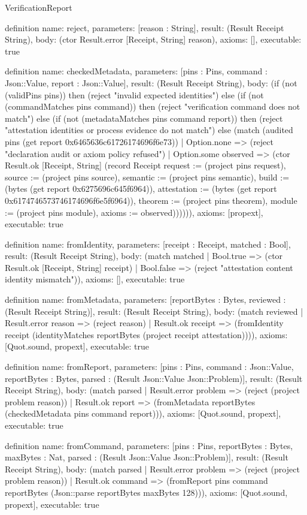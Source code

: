 \begin{lexlean}{VerificationReport}
\begin{semanticmodule}
definition{
  name: reject,
  parameters: [reason : String],
  result: (Result Receipt String),
  body: (ctor Result.error [Receipt, String] reason),
  axioms: [],
  executable: true
}

definition{
  name: checkedMetadata,
  parameters: [pins : Pins, command : Json::Value, report : Json::Value],
  result: (Result Receipt String),
  body: (if (not (validPins pins)) then (reject "invalid expected identities") else (if (not (commandMatches pins command)) then (reject "verification command does not match") else (if (not (metadataMatches pins command report)) then (reject "attestation identities or process evidence do not match") else (match (audited pins (get report 0x6465636c61726174696f6e73)) | Option.none => (reject "declaration audit or axiom policy refused") | Option.some observed => (ctor Result.ok [Receipt, String] (record Receipt {request := (project pins request), source := (project pins source), semantic := (project pins semantic), build := (bytes (get report 0x6275696c645f6964)), attestation := (bytes (get report 0x6174746573746174696f6e5f6964)), theorem := (project pins theorem), module := (project pins module), axioms := observed})))))),
  axioms: [propext],
  executable: true
}

definition{
  name: fromIdentity,
  parameters: [receipt : Receipt, matched : Bool],
  result: (Result Receipt String),
  body: (match matched | Bool.true => (ctor Result.ok [Receipt, String] receipt) | Bool.false => (reject "attestation content identity mismatch")),
  axioms: [],
  executable: true
}

definition{
  name: fromMetadata,
  parameters: [reportBytes : Bytes, reviewed : (Result Receipt String)],
  result: (Result Receipt String),
  body: (match reviewed | Result.error reason => (reject reason) | Result.ok receipt => (fromIdentity receipt (identityMatches reportBytes (project receipt attestation)))),
  axioms: [Quot.sound, propext],
  executable: true
}

definition{
  name: fromReport,
  parameters: [pins : Pins, command : Json::Value, reportBytes : Bytes, parsed : (Result Json::Value Json::Problem)],
  result: (Result Receipt String),
  body: (match parsed | Result.error problem => (reject (project problem reason)) | Result.ok report => (fromMetadata reportBytes (checkedMetadata pins command report))),
  axioms: [Quot.sound, propext],
  executable: true
}

definition{
  name: fromCommand,
  parameters: [pins : Pins, reportBytes : Bytes, maxBytes : Nat, parsed : (Result Json::Value Json::Problem)],
  result: (Result Receipt String),
  body: (match parsed | Result.error problem => (reject (project problem reason)) | Result.ok command => (fromReport pins command reportBytes (Json::parse reportBytes maxBytes 128))),
  axioms: [Quot.sound, propext],
  executable: true
}


\end{semanticmodule}
\end{lexlean}
